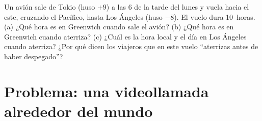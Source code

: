 \begin{exercise}[$\star\star\star$]\label{exo:g6:latitude-longitude:12}
Un avión sale de Tokio (huso $+9$) a las 6 de la tarde del lunes y vuela
hacia el este, cruzando el Pacífico, hasta Los Ángeles (huso $-8$). El vuelo
dura 10~horas. (a) ¿Qué hora es en Greenwich cuando sale el avión?
(b) ¿Qué hora es en Greenwich cuando aterriza? (c) ¿Cuál es la hora local
y el día en Los Ángeles cuando aterriza? ¿Por qué dicen los viajeros que en
este vuelo ``aterrizas antes de haber despegado''?
\end{exercise}

\section{Problema: una videollamada alrededor del mundo}

